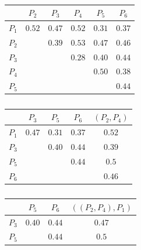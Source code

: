 \documentclass[12pt, a4paper]{article}
\begin{document}
\begin{latin}
\begin{table}[h]
    \caption{}
    \label{single_linkage}
    \begin{subtable}{0.45\linewidth}
    \caption{}
    \begin{tabular}{c|c|c|c|c|c}
              & $P_2$  & $P_3$  & $P_4$                        & $P_5$  & $P_6$  \\
        \hline
        $P_1$ & $0.52$ & $0.47$ & $0.52$                       & $0.31$ & $0.37$ \\
        \hline
        $P_2$ &        & $0.39$ & \cellcolor{purple!30} $0.53$ & $0.47$ & $0.46$ \\
        \hline
        $P_3$ &        &        & $0.28$                       & $0.40$ & $0.44$ \\
        \hline
        $P_4$ &        &        &                              & $0.50$ & $0.38$ \\
        \hline
        $P_5$ &        &        &                              &        & $0.44$ \\
    \end{tabular}
    \end{subtable}
    \hfill
    \begin{subtable}{0.45\linewidth}
    \caption{}
    \begin{tabular}{c|c|c|c|c}
        & $P_3$  & $P_5$  & $P_6$ & $(P_2, P_4)$  \\
        \hline
        $P_1$ & $0.47$ & $0.31$ & $0.37$ & \cellcolor{purple!30} $0.52$ \\
        \hline
        $P_3$ & & $0.40$ & $0.44$ & $0.39$\\
        \hline
        $P_5$ & & & $0.44$ & $0.5$ \\
        \hline
        $P_6$ & & & & $0.46$ \\
    \end{tabular}
    \end{subtable}
    \newline
    \begin{subtable}{0.45\linewidth}
        \caption{}
        \begin{tabular}{c|c|c|c}
                  & $P_5$  & $P_6$  & $((P_2, P_4), P_1)$\\
            \hline
            $P_3$ & $0.40$ & $0.44$ & $0.47$\\
            \hline
            $P_5$ &        & $0.44$ & \cellcolor{purple!30} $0.5$\\

\end{tabular}
\end{subtable}
\end{table}
\end{latin}
\end{document}
